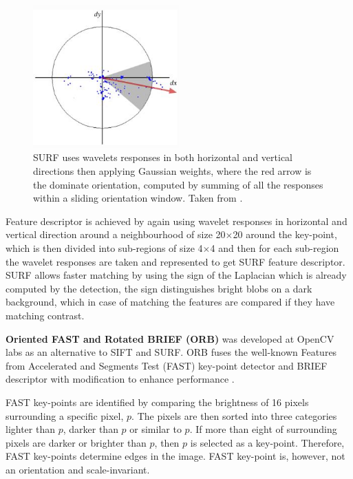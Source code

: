 \begin{figure}[H]
    \centering
    \includegraphics[width=0.5\textwidth]{UCT_MSc_Thesis/figs/surf_orientation.png}
    \caption[Surf wavelet responses]{SURF uses wavelets responses in both horizontal and vertical directions then applying Gaussian weights, where the red arrow is the dominate orientation, computed by summing of all the responses within a sliding orientation window. Taken from \cite{BAY2008346}.}
    \label{fig:surf_orientation}
\end{figure}

Feature descriptor is achieved by again using wavelet responses in horizontal and vertical direction around a neighbourhood of size 20$\times$20 around the key-point, which is then divided into sub-regions of size 4$\times
$4 and then for each sub-region the wavelet responses are taken and represented to get SURF feature descriptor. SURF allows faster matching by using the sign of the Laplacian which is already computed by the detection, the sign distinguishes bright blobs on a dark background, which in case of matching the features are compared if they have matching contrast.

\textbf{Oriented FAST and Rotated BRIEF (ORB)} was developed at OpenCV labs as an alternative to SIFT and SURF. ORB fuses the well-known Features from Accelerated and Segments Test (FAST) key-point detector and BRIEF descriptor with modification to enhance performance \cite{Rublee2011}. 

FAST key-points are identified by comparing the brightness of 16 pixels surrounding a specific pixel, $p$. The pixels are then sorted into three categories lighter than $p$, darker than $p$ or similar to $p$. If more than eight of surrounding pixels are darker or brighter than $p$, then $p$ is selected as a key-point. Therefore, FAST key-points determine edges in the image. FAST key-point is, however, not an orientation and scale-invariant.

